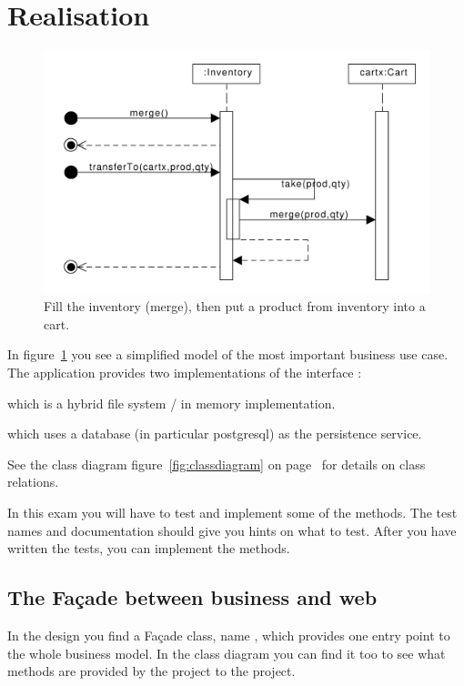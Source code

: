 \section{Realisation}
\label{sec:realisation} 
\begin{figure}
\centering\vspace{-2\baselineskip}
  \includegraphics[width=.9\linewidth]{figures/fillInventorySellProduct_seqd}
  \caption{\label{seq:mergandtransfer}Fill the inventory (merge), then
    put a product from inventory into a cart.}
\end{figure}%
In figure~\ref{seq:mergandtransfer} you see a simplified model of the most
important business use case.
%
The application provides two implementations of the interface 
:
\begin{enumerate*}
\item {} which is a hybrid file system / in memory implementation.
\item {} which uses a database (in particular
  postgresql) as the persistence service.
\end{enumerate*}

See the class diagram figure~\ref{fig:classdiagram} on
page~\pageref{fig:classdiagram} for details on class relations.

In this exam you will have to test and implement some of the methods.
The test names and documentation should give you hints on what to
test. After you have written the tests, you can implement the methods.

\subsection{The Façade between business and web}
In the design you find a Façade class, name , 
which provides one entry point to the whole business model. In the
class diagram you can find it too to see what methods are provided by
the  project to the  project.


